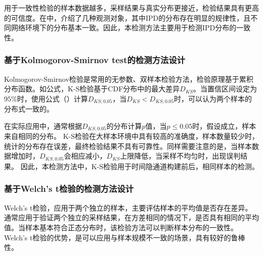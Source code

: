 用于一致性检验的样本数据越多，采样结果与真实分布更接近，检验结果具有更高的可信度。在中，介绍了几种观测对象，其中IPD的分布存在明显的规律性，且不同网络环境下的分布基本一致。因此，本检测方法主要用于检测IPD分布的一致性。

\subsubsection{基于Kolmogorov-Smirnov test的检测方法设计}
\label{chap:analyze:statistical:test:ks}

Kolmogorov-Smirnov检验是常用的无参数、双样本检验方法，检验原理基于累积分布函数。如公式，K-S检验基于CDF分布中的最大差异$D_{KS}$。当置信区间设定为$95\%$时，使用公式（）计算$D_{KS,0.05}$，当$D_{KS}<D_{KS,0.05}$时，可以认为两个样本的分布式一致的。

在实际应用中，通常根据$D_{KS,0.05}$的分布计算$p$值，当$p\leq 0.05$时，假设成立，样本来自相同的分布。
K-S检验在大样本环境中具有较高的准确度，样本数量较少时，统计的分布存在误差，最终检验结果不具有可靠性。同样需要注意的是，当样本数据增加时，$D_{KS,0.05}$会相应减小，$D_{KS}$上限降低，当采样不均匀时，出现误判结果。
因此，本检测方法中，K-S检验用于时间隐通道构建前后，相同样本的检测。

\subsubsection{基于Welch’s t检验的检测方法设计}
\label{chap:analyze:statistical:test:t}

Welch’s t检验，应用于两个独立的样本，主要评估样本的平均值是否存在差异。通常应用于验证两个独立的采样结果，在方差相同的情况下，是否具有相同的平均值。当样本基本符合正态分布时，该检验方法可以判断样本分布的一致性。Welch's t检验的优势，是可以应用与样本规模不一致的场景，具有较好的鲁棒性。


